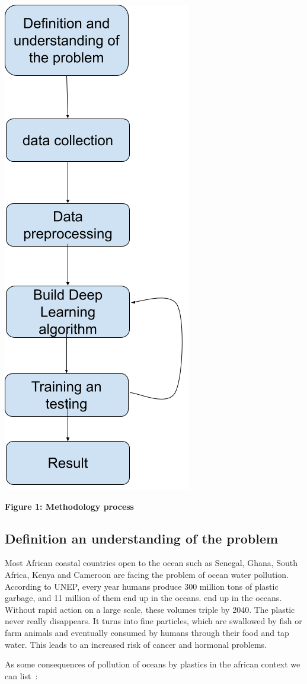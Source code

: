 \documentclass[a4paper, 12pt]{report}
\begin{document}
\begin{center}

    \includegraphics[height = 0.55 \linewidth]{graph.png}

    \textbf{Figure 1: Methodology process}

\end{center}


\subsection{Definition an understanding of the problem}

Most African coastal countries open to the ocean such as Senegal, Ghana, South Africa, Kenya and Cameroon are facing the problem of ocean water pollution. According to UNEP\cite{UNEP}, every year humans produce 300 million tons of plastic garbage, and 11 million of them end up in the oceans. end up in the oceans. Without rapid action on a large scale, these volumes triple by 2040. The plastic never really disappears. It turns into fine particles, which are swallowed by fish or farm animals and eventually consumed by humans through their food and tap water. This leads to an increased risk of cancer and hormonal problems.

As some consequences of pollution of oceans by plastics in the african context we can list :
\end{document}
